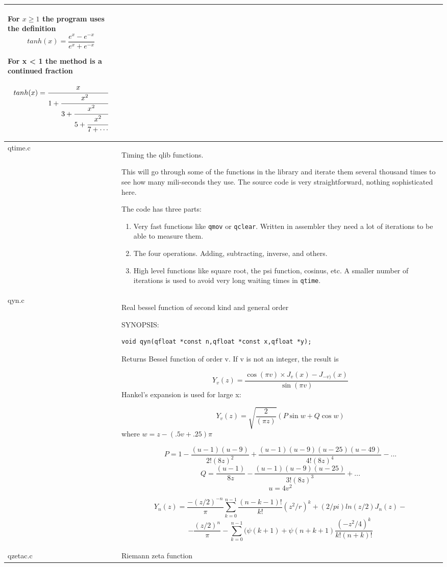 \documentclass[10pt,a4paper,x11names]{memoir} %
\begin{document}
\begin{longtable}{|p{1.5cm}|p{11.5cm}|}
	For $x \ge 1$ the program uses the definition
	$$ tanh(x)=\frac{e^x -e^{-x}}{e^x+e^{-x}}$$
	
	For x < 1 the method is a continued fraction
	
	$$tanh(x)=\cfrac{x}{1+\cfrac{x^2}{3+\cfrac{x^2}{5+\cfrac{x^2}{7+\dotsb}}}}$$
	\\\hline
	qtime.c& Timing the qlib functions.
	
	This will go through some of the functions in the library and iterate them several thousand times to see how many mili-seconds they use. The source code is very straightforward, nothing sophisticated here.
	
	The code has three parts:
	\begin{enumerate}
		\item Very fast functions like \verb,qmov, or \verb,qclear,. Written in assembler they need a lot of iterations to be able to measure them.
		\item The four operations. Adding, subtracting, inverse, and others.
		\item High level functions like square root, the psi function, cosinus, etc. A smaller number of iterations is used to avoid very long waiting times in \verb,qtime,.
	\end{enumerate}
	\\\hline
	qyn.c& Real bessel function of second kind and general order
	
	{\footnotesize SYNOPSIS:}\vspace{-0.2cm}
	\begin{lstlisting}[numbers=none]
		void qyn(qfloat *const n,qfloat *const x,qfloat *y);
	\end{lstlisting}\vspace{-0.2cm}
	Returns Bessel function of order v.
	If v is not an integer, the result is
	
	$$Y_v (z) = \frac{ \cos(\pi v) \times J_v (x) - J_{-v)}  (x) }{\sin(\pi v)}$$
	Hankel's expansion is used for large x:
	
	$$ Y_v (z) = \sqrt{\frac{2}{(\pi z)}} (P \sin w + Q \cos w)$$  where  $w = z - (.5 v + .25) \pi$  
	
	$$ P=1-\frac{(u-1)(u-9)}{2! (8z)^2} + \frac{(u-1)(u-9)(u-25)(u-49)}{4! (8z)^4} - ...$$
	$$ Q= \frac{(u-1)}{8z}-\frac{(u-1)(u-9)(u-25)}{3! (8z)^3} + ...$$
	$$u=4v^2$$
	
	$$Y_n(z)=\frac{-(z/2)^{-n}}{\pi} \sum_{k=0}^{n-1}\frac{(n-k-1)!}{k!}(z^2/r)^k+(2/pi)ln(z/2)J_n(z)-$$
	$$ -\frac{(z/2)^n}{\pi} - \sum_{k=0}^{n-1}(\psi(k+1)+\psi(n+k+1)\frac{(-z^2/4)^k}{k!(n+k)!}$$   
	\\\hline
	qzetac.c& Riemann zeta function
	

\end{longtable}
\end{document}
